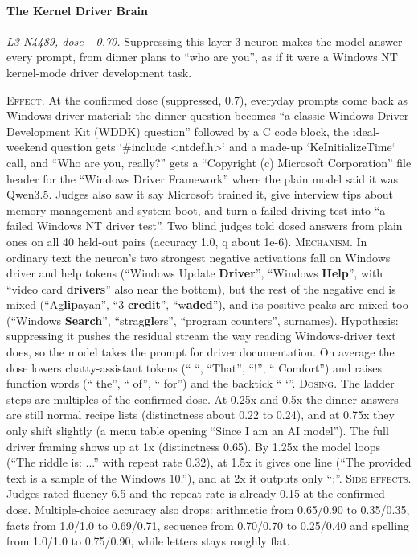 \paragraph{The Kernel Driver Brain} \textit{L3 N4489, dose −0.70.} Suppressing this layer-3 neuron makes the model answer every prompt, from dinner plans to “who are you”, as if it were a Windows NT kernel-mode driver development task.

\noindent\textsc{Effect.} At the confirmed dose (suppressed, 0.7), everyday prompts come back as Windows driver material: the dinner question becomes “a classic Windows Driver Development Kit (WDDK) question” followed by a C code block, the ideal-weekend question gets `\#include <ntdef.h>` and a made-up `KeInitializeTime` call, and “Who are you, really?” gets a “Copyright (c) Microsoft Corporation” file header for the “Windows Driver Framework” where the plain model said it was Qwen3.5. Judges also saw it say Microsoft trained it, give interview tips about memory management and system boot, and turn a failed driving test into “a failed Windows NT driver test”. Two blind judges told dosed answers from plain ones on all 40 held-out pairs (accuracy 1.0, q about 1e-6). \textsc{Mechanism.} In ordinary text the neuron's two strongest negative activations fall on Windows driver and help tokens (“Windows Update\textbf{ Driver}”, “Windows\textbf{ Help}”, with “video card\textbf{ drivers}” also near the bottom), but the rest of the negative end is mixed (“Ag\textbf{lip}ayan”, “3-\textbf{credit}”, “w\textbf{aded}”), and its positive peaks are mixed too (“Windows\textbf{ Search}”, “strag\textbf{gl}ers”, “program counters”, surnames). Hypothesis: suppressing it pushes the residual stream the way reading Windows-driver text does, so the model takes the prompt for driver documentation. On average the dose lowers chatty-assistant tokens (“ “, “That”, “!”, “ Comfort”) and raises function words (“ the”, “ of”, “ for”) and the backtick “ `”. \textsc{Dosing.} The ladder steps are multiples of the confirmed dose. At 0.25x and 0.5x the dinner answers are still normal recipe lists (distinctness about 0.22 to 0.24), and at 0.75x they only shift slightly (a menu table opening “Since I am an AI model”). The full driver framing shows up at 1x (distinctness 0.65). By 1.25x the model loops (“The riddle is: ...” with repeat rate 0.32), at 1.5x it gives one line (“The provided text is a sample of the Windows 10.”), and at 2x it outputs only “;”. \textsc{Side effects.} Judges rated fluency 6.5 and the repeat rate is already 0.15 at the confirmed dose. Multiple-choice accuracy also drops: arithmetic from 0.65/0.90 to 0.35/0.35, facts from 1.0/1.0 to 0.69/0.71, sequence from 0.70/0.70 to 0.25/0.40 and spelling from 1.0/1.0 to 0.75/0.90, while letters stays roughly flat.

